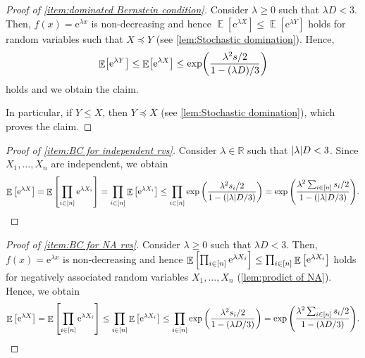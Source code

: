 \documentclass[letterpaper,11pt]{article}
\DeclarePairedDelimiter{\rbra}{\lparen}{\rparen} %
\DeclarePairedDelimiter{\sbra}{\lbrack}{\rbrack} %
\DeclareMathOperator*{\E}{\mathbb{E}}
\newcommand{\e}{\mathrm{e}}
\newcommand{\bounded}{D}
\newcommand{\variance}{s}
\begin{document}
    \begin{proof}[Proof of \cref{item:dominated Bernstein condition}]
    Consider $\lambda \geq 0$ such that $\lambda \bounded <3$.
    Then, $f(x) = \e^{\lambda x}$ is non-decreasing and hence $\E[\e^{\lambda X}]\leq \E[\e^{\lambda Y}]$ holds for random variables such that $X\preceq Y$ (see \cref{lem:Stochastic domination}).
    Hence, 
        \begin{align*}
            \E\sbra*{\e^{\lambda Y}}
            \leq \E\sbra*{\e^{\lambda X}}
            \leq \exp\rbra*{\frac{\lambda^2\variance/2}{1-(\lambda \bounded )/3}}
        \end{align*}
        holds and we obtain the claim.

      In particular, if $Y\leq X$, then $Y\preceq X$ (see \cref{lem:Stochastic domination}), which proves the claim.
    \end{proof}
    \begin{proof}[Proof of \cref{item:BC for independent rvs}]
    Consider $\lambda \in \mathbb{R}$ such that $\abs{\lambda}\bounded <3$.
   Since $X_1,\ldots, X_n$ are independent, we obtain
    \begin{align*}
    \E\qty[\mathrm{e}^{\lambda X}]=\E\qty[\prod_{i\in [n]}\mathrm{e}^{\lambda X_i}]
    =\prod_{i\in [n]}\E\qty[\mathrm{e}^{\lambda X_i}]
    \leq \prod_{i\in [n]}\exp\qty(\frac{\lambda^2s_i/2}{1-(\abs{\lambda}\bounded/3)})
    =\exp\qty(\frac{\lambda^2\sum_{i\in[n]}s_i/2}{1-(\abs{\lambda}\bounded/3)}).
    \end{align*}
  \end{proof}  
  \begin{proof}[Proof of \cref{item:BC for NA rvs}]
    Consider $\lambda \geq 0$ such that $\lambda \bounded <3$.
    Then, $f(x)=\e^{\lambda x}$ is non-decreasing and hence
    $\E\qty[\prod_{i\in [n]}\mathrm{e}^{\lambda X_i}]
    \leq \prod_{i\in [n]}\E\qty[\mathrm{e}^{\lambda X_i}]$
    holds for negatively associated random variables $X_1,\ldots, X_n$ (\cref{lem:prodict of NA}).
    Hence, we obtain
    \begin{align*}
    \E\qty[\mathrm{e}^{\lambda X}]
    =\E\qty[\prod_{i\in [n]}\mathrm{e}^{\lambda X_i}] 
    \leq \prod_{i\in [n]}\E\qty[\mathrm{e}^{\lambda X_i}] 
    \leq \prod_{i\in [n]}\exp\qty(\frac{\lambda^2s_i/2}{1-(\lambda\bounded/3)})
    =\exp\qty(\frac{\lambda^2\sum_{i\in[n]}s_i/2}{1-(\lambda\bounded/3)}).
    \end{align*}
  \end{proof} 
\end{document}

